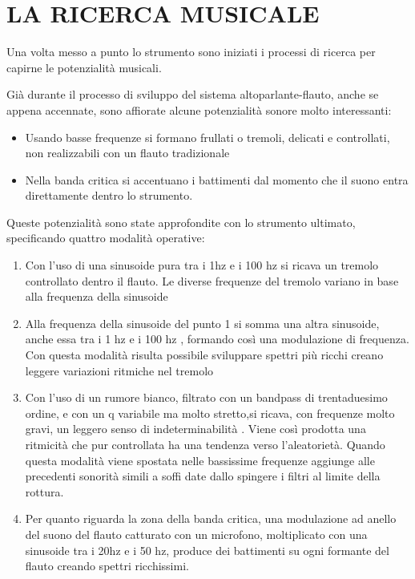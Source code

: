 
\chapter{LA RICERCA MUSICALE}
\label{chp:ricerca}

Una volta messo a punto  lo strumento sono iniziati i processi di ricerca  per capirne le potenzialità musicali.

Già durante il processo di  sviluppo del sistema altoparlante-flauto, anche se appena accennate,  sono affiorate alcune potenzialità sonore molto interessanti:

\begin{itemize}
  \item Usando  basse frequenze si formano frullati o tremoli, delicati e controllati, non realizzabili con un flauto tradizionale
  \item Nella banda critica si accentuano i battimenti dal momento che il suono entra direttamente dentro lo strumento.
\end{itemize}

Queste potenzialità sono state approfondite con lo strumento ultimato, specificando quattro modalità operative:

\begin{enumerate}
  \item Con l’uso di una sinusoide pura tra i 1hz e i 100 hz si ricava un tremolo controllato dentro il flauto. Le diverse  frequenze del tremolo variano  in base alla frequenza della sinusoide
  \item Alla frequenza della sinusoide del punto 1 si somma  una altra sinusoide, anche essa tra i 1 hz e i 100 hz , formando così una modulazione di frequenza.  Con questa modalità risulta possibile sviluppare spettri più ricchi creano leggere variazioni ritmiche  nel tremolo
  \item Con l’uso di un rumore bianco, filtrato con un bandpass di trentaduesimo ordine, e  con un q variabile ma  molto stretto,si ricava, con frequenze molto gravi, un leggero senso di indeterminabilità . Viene così prodotta  una ritmicità che pur controllata ha una tendenza verso l’aleatorietà. Quando questa modalità viene  spostata  nelle bassissime frequenze aggiunge alle precedenti sonorità simili a soffi date dallo spingere i filtri al limite della rottura.
  \item Per quanto riguarda la zona della  banda critica, una modulazione ad anello del suono del flauto catturato con un microfono, moltiplicato   con una sinusoide tra i 20hz e i 50 hz, produce  dei battimenti su ogni formante del flauto creando spettri ricchissimi.
\end{enumerate}

